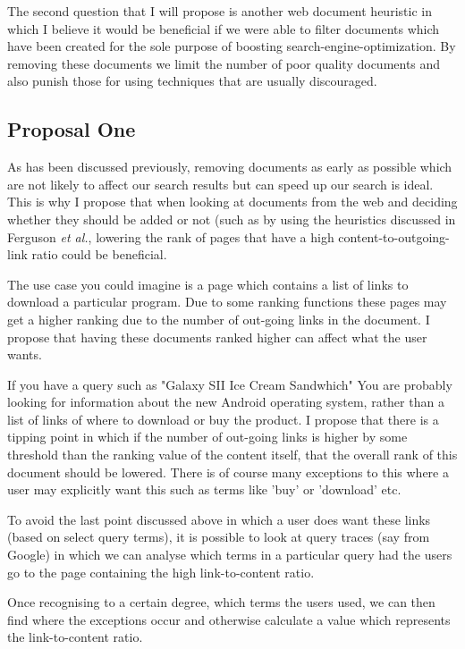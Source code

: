 \documentclass{acm_proc_article-sp}
\begin{document}
The second question that I will propose is another web document heuristic in which I believe it would be beneficial if we were able to filter documents which have been created for the sole purpose of boosting search-engine-optimization. By removing these documents we limit the number of poor quality documents and also punish those for using techniques that are usually discouraged. 

\subsection{Proposal One}

As has been discussed previously, removing documents as early as possible which are not likely to affect our search results but can speed up our search is ideal. This is why I propose that when looking at documents from the web and deciding whether they should be added or not (such as by using the heuristics discussed in Ferguson \emph{et al.}, lowering the rank of pages that have a high content-to-outgoing-link ratio could be beneficial.

The use case you could imagine is a page which contains a list of links to download a particular program. Due to some ranking functions these pages may get a higher ranking due to the number of out-going links in the document. I propose that having these documents ranked higher can affect what the user wants.

If you have a query such as "Galaxy SII Ice Cream Sandwhich" You are probably looking for information about the new Android operating system, rather than a list of links of where to download or buy the product. I propose that there is a tipping point in which if the number of out-going links is higher by some threshold than the ranking value of the content itself, that the overall rank of this document should be lowered. There is of course many exceptions to this where a user may explicitly want this such as terms like 'buy' or 'download' etc.

To avoid the last point discussed above in which a user does want these links (based on select query terms), it is possible to look at query traces (say from Google) in which we can analyse which terms in a particular query had the users go to the page containing the high link-to-content ratio.

Once recognising to a certain degree, which terms the users used, we can then find where the exceptions occur and otherwise calculate a value which represents the link-to-content ratio.
\end{document}
